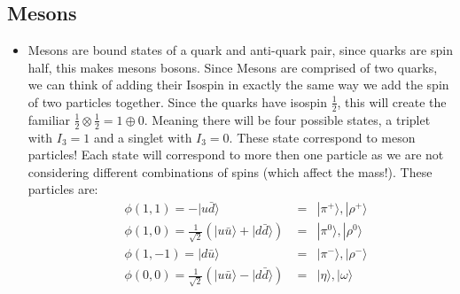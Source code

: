 \documentclass[11pt]{article}
\numberwithin{equation}{section}
\begin{document}
\subsection{Mesons} %
\label{sub:mesons}
\begin{itemize}
    \item Mesons are bound states of a quark and anti-quark pair, since quarks are spin half, this makes mesons bosons. Since Mesons are comprised of two quarks, we can think of adding their Isospin in exactly the same way we add the spin of two particles together. Since the quarks have isospin $\frac{1}{2}$, this will create the familiar $\frac{1}{2} \otimes \frac{1}{2} = 1 \oplus 0$. Meaning there will be four possible states, a triplet with $I_3=1$ and a singlet with $I_3=0$. These state correspond to meson particles! Each state will correspond to more then one particle as we are not considering different combinations of spins (which affect the mass!). These particles are:
\begin{align*}
    &\phi(1,1) = -|\! u\bar{d} \rangle \; &=& |\pi^{+} \rangle, |\rho^{+} \rangle \\ 
    &\phi(1,0) = \frac{1}{\sqrt{2}}\left(|\! u\bar{u} \rangle + |\! d\bar{d} \rangle \right) \; &=& |\pi^{0} \rangle, |\rho^{0} \rangle \\ 
    &\phi(1,-1) = |\! d\bar{u} \rangle \; &=& |\pi^{-} \rangle, |\rho^{-} \rangle \\ 
    &\phi(0,0) = \frac{1}{\sqrt{2}}\left(|\! u\bar{u} \rangle - |\! d\bar{d} \rangle \right) \; &=& |\eta \rangle, |\omega \rangle
\end{align*}

\end{itemize}
\end{document}

